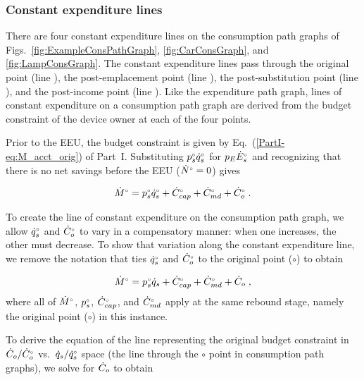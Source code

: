 \subsubsection{Constant expenditure lines} 
\label{sec:pref_graph_constant_expenditure_lines}

There are four constant expenditure lines on the consumption path graphs of
Figs.~\ref{fig:ExampleConsPathGraph}, \ref{fig:CarConsGraph}, and \ref{fig:LampConsGraph}.
The constant expenditure lines pass through 
the original point (line \circcirc{}), 
the post-emplacement point (line \starstar{}), 
the post-substitution point (line \hathat{}), and 
the post-income point (line \barbar{}).
Like the expenditure path graph, 
lines of constant expenditure on a consumption path graph 
are derived from the budget constraint of the device owner
at each of the four points.

Prior to the EEU, the budget constraint is given by Eq.~(\ref{PartI-eq:M_acct_orig}) of Part~I.
Substituting ${}{p}^{\scriptscriptstyle \circ}_s {}{\dot{q}}^{\scriptscriptstyle \circ}_s$ for $p_E {}{\dot{E}}^{\scriptscriptstyle \circ}_s$ and 
recognizing that there is no net savings before the EEU
(${}{\dot{N}}^{\scriptscriptstyle \circ} = 0$) gives

\begin{equation}
  {}{\dot{M}}^{\scriptscriptstyle \circ} = {}{p}^{\scriptscriptstyle \circ}_s {}{\dot{q}}^{\scriptscriptstyle \circ}_s + {}{\dot{C}}^{\scriptscriptstyle \circ}_{cap} + {}{\dot{C}}^{\scriptscriptstyle \circ}_{md} + {}{\dot{C}}^{\scriptscriptstyle \circ}_o \; .
\end{equation}

To create the line of constant expenditure on the consumption path graph, 
we allow ${}{\dot{q}}^{\scriptscriptstyle \circ}_s$ and ${}{\dot{C}}^{\scriptscriptstyle \circ}_o$ to vary in a compensatory manner:
when one increases, the other must decrease.  
To show that variation along the constant expenditure line, 
we remove the notation that ties ${}{\dot{q}}^{\scriptscriptstyle \circ}_s$ and ${}{\dot{C}}^{\scriptscriptstyle \circ}_o$
to the original point ($\circ$) to obtain

\begin{equation}
  {}{\dot{M}}^{\scriptscriptstyle \circ} = {}{p}^{\scriptscriptstyle \circ}_s \dot{q}_s + {}{\dot{C}}^{\scriptscriptstyle \circ}_{cap} + {}{\dot{C}}^{\scriptscriptstyle \circ}_{md} + \dot{C}_o \; , 
\end{equation}
%
where all of ${}{\dot{M}}^{\scriptscriptstyle \circ}$, ${}{p}^{\scriptscriptstyle \circ}_s$, ${}{\dot{C}}^{\scriptscriptstyle \circ}_{cap}$, and ${}{\dot{C}}^{\scriptscriptstyle \circ}_{md}$
apply at the same rebound stage, 
namely the original point ($\circ$) in this instance.

To derive the equation of the line representing the original budget constraint 
in $\dot{C}_o/{}{\dot{C}}^{\scriptscriptstyle \circ}_o$ vs.\ $\dot{q}_s/{}{\dot{q}}^{\scriptscriptstyle \circ}_s$ space
(the \circcirc{} line through the $\circ$ point
in consumption path graphs), 
we solve for $\dot{C}_o$ to obtain

